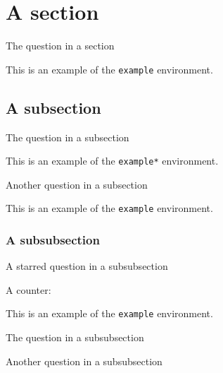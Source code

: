 \documentclass{scrartcl}
\begin{document}
\section{A section}

\begin{question}
The question in a section
\end{question}

\begin{example}
    This is an example of the \texttt{example} environment.
\end{example}

\subsection{A subsection}

\begin{question}
The question in a subsection
\end{question}

\begin{example*}
    This is an example of the \texttt{example*} environment.
\end{example*}

\begin{question}
Another question in a subsection
\end{question}

\begin{example}
    This is an example of the \texttt{example} environment.
\end{example}

\subsubsection{A subsubsection}

\begin{question*}
A starred question in a subsubsection
\end{question*}

A counter: 

\begin{example}
    This is an example of the \texttt{example} environment.
\end{example}


\begin{question}
The question in a subsubsection
\end{question}

\begin{question}
Another question in a subsubsection
\end{question}
\end{document}
